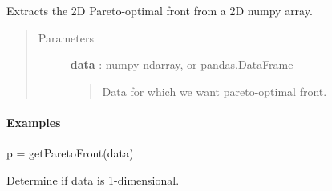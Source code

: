 \documentclass[letterpaper,10pt,english]{sphinxmanual}
\begin{document}

\begin{fulllineitems}
\label{qikify:qikify.helpers.create_logger}
\end{fulllineitems}


\begin{fulllineitems}
\label{qikify:qikify.helpers.getParetoFront}
Extracts the 2D Pareto-optimal front from a 2D numpy array.
\begin{quote}\begin{description}
\item[{Parameters }] \leavevmode
\textbf{data} : numpy ndarray, or pandas.DataFrame
\begin{quote}

Data for which we want pareto-optimal front.
\end{quote}

\end{description}\end{quote}
\paragraph{Examples}

p = getParetoFront(data)

\end{fulllineitems}


\begin{fulllineitems}
\label{qikify:qikify.helpers.is1D}
Determine if data is 1-dimensional.

\end{fulllineitems}

\end{document}
